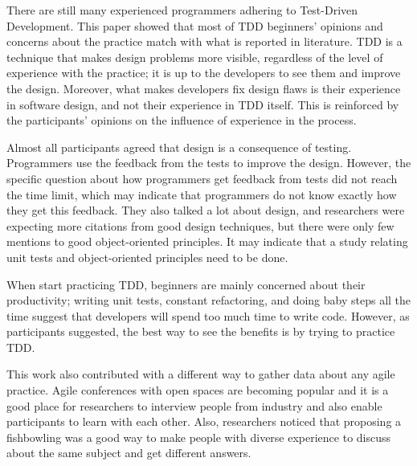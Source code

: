 There are still many experienced programmers adhering to Test-Driven
Development. This paper showed that most of TDD beginners' opinions and concerns
about the practice match with what is reported in literature. 
TDD is a technique that makes design problems more visible, regardless of the
level of experience with the practice; it is up to the developers to see them
and improve the design. Moreover, what makes developers fix design flaws is
their experience in software design, and not their experience in TDD itself. 
This is reinforced by the participants' opinions on the influence of experience
in the process.

Almost all participants agreed that design is a consequence of testing.
Programmers use the feedback from the tests to improve the
design. However, the specific question about how programmers get feedback from
tests did not reach the time limit, which may indicate that programmers do not
know exactly how they get this feedback.
They also talked a lot about design, and researchers were expecting
more citations from good design techniques, but there were only few
mentions to good object-oriented principles. It may indicate that a study
relating unit tests and object-oriented principles need to be done.

When start practicing TDD, beginners are mainly concerned about their
productivity; writing unit tests, constant refactoring, and doing baby steps all
the time suggest that developers will spend too much time to write code.
However, as participants suggested, the best way to see the benefits is by
trying to practice TDD.

This work also contributed with a different way to gather data about any agile
practice. Agile conferences with open spaces are becoming popular and it is a
good place for researchers to interview people from industry and also enable
participants to learn with each other. Also, researchers noticed that proposing
a fishbowling was a good way to make people with diverse experience to discuss
about the same subject and get different answers.
